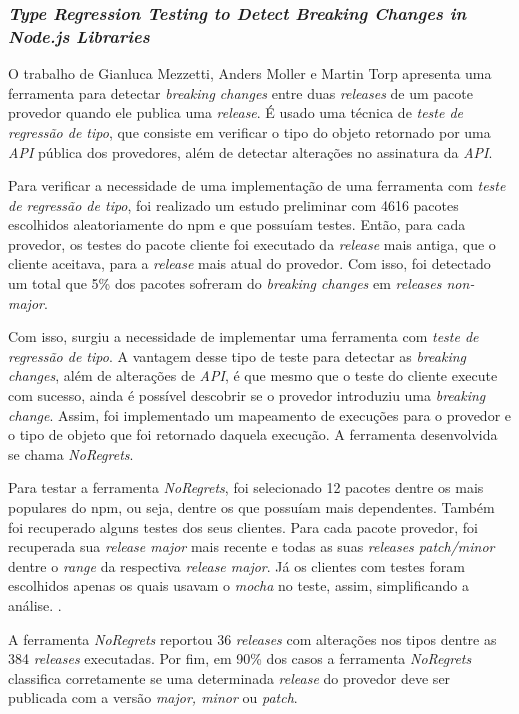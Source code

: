 \subsubsection{\textit{Type Regression Testing to Detect Breaking Changes in Node.js Libraries}}

O trabalho de Gianluca Mezzetti, Anders Moller e Martin Torp apresenta uma ferramenta para detectar \textit{breaking changes} entre duas \textit{releases} de um pacote provedor quando ele publica uma \textit{release}. É usado uma técnica de \textit{teste de regressão de tipo}, que consiste em verificar o tipo do objeto retornado por uma \textit{API} pública dos provedores, além de detectar alterações no assinatura da \textit{API}.

Para verificar a necessidade de uma implementação de uma ferramenta com \textit{teste de regressão de tipo}, foi realizado um estudo preliminar com 4616 pacotes escolhidos aleatoriamente do \gls{npm} e que possuíam testes. Então, para cada provedor, os testes do pacote cliente foi executado da \textit{release} mais antiga, que o cliente aceitava, para a \textit{release} mais atual do provedor. Com isso, foi detectado um total que 5\% dos pacotes sofreram do \textit{breaking changes} em \textit{releases non-major}.

Com isso, surgiu a necessidade de implementar uma ferramenta com \textit{teste de regressão de tipo}. A vantagem desse tipo de teste para detectar as \textit{breaking changes}, além de alterações de \textit{API}, é que mesmo que o teste do cliente execute com sucesso, ainda é possível descobrir se o provedor introduziu uma \textit{breaking change}. Assim, foi implementado um mapeamento de execuções para o provedor e o tipo de objeto que foi retornado daquela execução. A ferramenta desenvolvida se chama \textit{NoRegrets}.

Para testar a ferramenta \textit{NoRegrets}, foi selecionado 12 pacotes dentre os mais populares do \gls{npm}, ou seja, dentre os que possuíam mais dependentes. Também foi recuperado alguns testes dos seus clientes. Para cada pacote provedor, foi recuperada sua \textit{release major} mais recente e todas as suas \textit{releases patch/minor} dentre o \textit{range} da respectiva \textit{release major}. Já os clientes com testes foram escolhidos apenas os quais usavam o \textit{mocha} no teste, assim, simplificando a análise. .

A ferramenta \textit{NoRegrets} reportou 36 \textit{releases} com alterações nos tipos dentre as 384 \textit{releases} executadas. Por fim, em 90\% dos casos a ferramenta \textit{NoRegrets} classifica corretamente se uma determinada \textit{release} do provedor deve ser publicada com a versão \textit{major, minor} ou \textit{patch}.